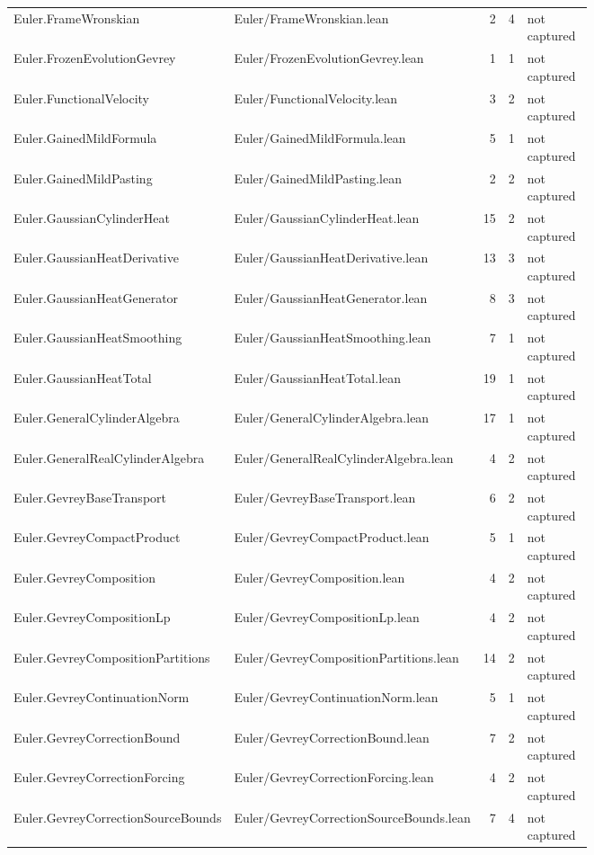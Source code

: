 \documentclass[10pt]{article}
\begin{document}
\begin{longtable}{p{0.28\linewidth}p{0.27\linewidth}r r p{0.20\linewidth}}
Euler.FrameWronskian & Euler/FrameWronskian.lean & 2 & 4 & not captured\\
Euler.FrozenEvolutionGevrey & Euler/FrozenEvolutionGevrey.lean & 1 & 1 & not captured\\
Euler.FunctionalVelocity & Euler/FunctionalVelocity.lean & 3 & 2 & not captured\\
Euler.GainedMildFormula & Euler/GainedMildFormula.lean & 5 & 1 & not captured\\
Euler.GainedMildPasting & Euler/GainedMildPasting.lean & 2 & 2 & not captured\\
Euler.GaussianCylinderHeat & Euler/GaussianCylinderHeat.lean & 15 & 2 & not captured\\
Euler.GaussianHeatDerivative & Euler/GaussianHeatDerivative.lean & 13 & 3 & not captured\\
Euler.GaussianHeatGenerator & Euler/GaussianHeatGenerator.lean & 8 & 3 & not captured\\
Euler.GaussianHeatSmoothing & Euler/GaussianHeatSmoothing.lean & 7 & 1 & not captured\\
Euler.GaussianHeatTotal & Euler/GaussianHeatTotal.lean & 19 & 1 & not captured\\
Euler.GeneralCylinderAlgebra & Euler/GeneralCylinderAlgebra.lean & 17 & 1 & not captured\\
Euler.GeneralRealCylinderAlgebra & Euler/GeneralRealCylinderAlgebra.lean & 4 & 2 & not captured\\
Euler.GevreyBaseTransport & Euler/GevreyBaseTransport.lean & 6 & 2 & not captured\\
Euler.GevreyCompactProduct & Euler/GevreyCompactProduct.lean & 5 & 1 & not captured\\
Euler.GevreyComposition & Euler/GevreyComposition.lean & 4 & 2 & not captured\\
Euler.GevreyCompositionLp & Euler/GevreyCompositionLp.lean & 4 & 2 & not captured\\
Euler.GevreyCompositionPartitions & Euler/GevreyCompositionPartitions.lean & 14 & 2 & not captured\\
Euler.GevreyContinuationNorm & Euler/GevreyContinuationNorm.lean & 5 & 1 & not captured\\
Euler.GevreyCorrectionBound & Euler/GevreyCorrectionBound.lean & 7 & 2 & not captured\\
Euler.GevreyCorrectionForcing & Euler/GevreyCorrectionForcing.lean & 4 & 2 & not captured\\
Euler.GevreyCorrectionSourceBounds & Euler/GevreyCorrectionSourceBounds.lean & 7 & 4 & not captured\\

\end{longtable}
\end{document}
